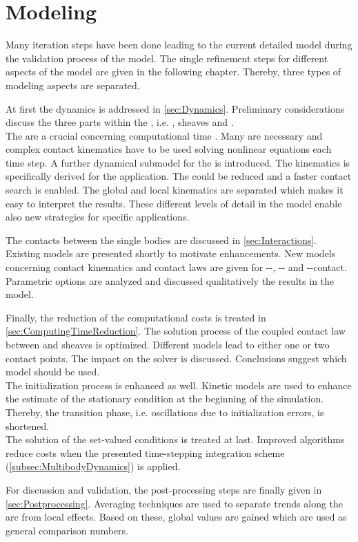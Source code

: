 \chapter{Modeling} \label{chap:Modeling}

Many iteration steps have been done leading to the current detailed model during the validation process of the model.
The single refinement steps for different aspects of the model are given in the following chapter.
Thereby, three types of modeling aspects are separated.\par
%
At first the dynamics is addressed in \cref{sec:Dynamics}.
Preliminary considerations discuss the three parts within the \CVT, i.e. \els, sheaves and \rings.\\
The \rings are a crucial concerning computational time \cite[p. 68]{schindler_spatial_2010}.
Many \DOFs are necessary and complex contact kinematics have to be used solving nonlinear equations each time step.
A further dynamical submodel for the \rings is introduced.
The kinematics is specifically derived for the \CVT application.
The \DOFs could be reduced and a faster contact search is enabled.
The global and local kinematics are separated which makes it easy to interpret the results.
These different levels of detail in the model enable also new strategies for specific applications.\par
%
The contacts between the single bodies are discussed in \cref{sec:Interactions}.
Existing models are presented shortly to motivate enhancements.
New models concerning contact kinematics and contact laws are given for \el-\el-, \el-\ring- and \el-\sheave-contact.
Parametric options are analyzed and discussed qualitatively \wrt the results in the \CVT model.
\par
%
Finally, the reduction of the computational costs is treated in \cref{sec:ComputingTimeReduction}.
The solution process of the coupled contact law between \els and sheaves is optimized.
Different models lead to either one or two contact points.
The impact on the solver is discussed.
Conclusions suggest which model should be used.\\
The initialization process is enhanced as well. 
Kinetic models are used to enhance the estimate of the stationary condition at the beginning of the simulation.
Thereby, the transition phase, i.e. oscillations due to initialization errors, is shortened.\\
The solution of the set-valued conditions is treated at last.
Improved algorithms reduce \CPU costs when the presented time-stepping integration scheme (\cref{subsec:MultibodyDynamics}) is applied.
\par
%
For discussion and validation, the post-processing steps are finally given in \cref{sec:Postprocessing}.
Averaging techniques are used to separate trends along the arc from local effects.
Based on these, global values are gained which are used as general comparison numbers.

